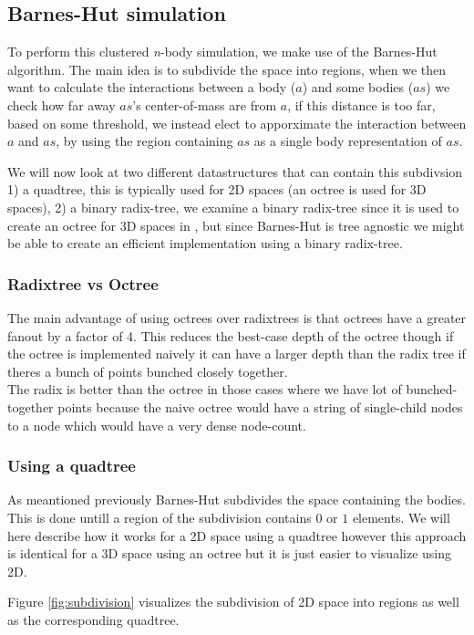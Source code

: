 \subsection{Barnes-Hut simulation}
To perform this clustered \textit{n}-body simulation, we make use of the
Barnes-Hut algorithm\cite{BH-algo}. The main idea is to subdivide the space into
regions, when we then want to calculate the interactions between a body ($a$)
and some bodies ($as$) we check how far away $as$'s center-of-mass are from $a$,
if this distance
is too far, based on some threshold, we instead elect to apporximate the
interaction between $a$ and $as$, by using the region containing $as$ as a
single body representation of $as$.

We will now look at two different datastructures that can contain this subdivsion
1) a quadtree, this is typically used for 2D spaces (an octree is used for 3D
spaces), 2) a binary radix-tree, we examine a binary radix-tree since it is used
to create an octree for 3D spaces in \cite{main-ref}, but since Barnes-Hut is
tree agnostic we might be able to create an efficient implementation using a
binary radix-tree.

\subsubsection{Radixtree vs Octree}
The main advantage of using octrees over radixtrees is that octrees have a
greater fanout by a factor of 4. This reduces the best-case depth of the octree
though if the octree is implemented naively it can have a larger depth than the
radix tree if theres a bunch of points bunched closely together.\\
The radix is better than the octree in those cases where we have lot of
bunched-together points because the naive octree would have a string of
single-child nodes to a node which would have a very dense node-count.

\subsubsection{Using a quadtree}
As meantioned previously Barnes-Hut subdivides the space containing the bodies.
This is done untill a region of the subdivision contains $0$ or $1$ elements.
We will here describe how it works for a 2D space using a quadtree however this
approach is identical for a 3D space using an octree but it is just easier to
visualize using 2D.

Figure \ref{fig:subdivision} visualizes the subdivision of 2D space into regions
as well as the corresponding quadtree.

